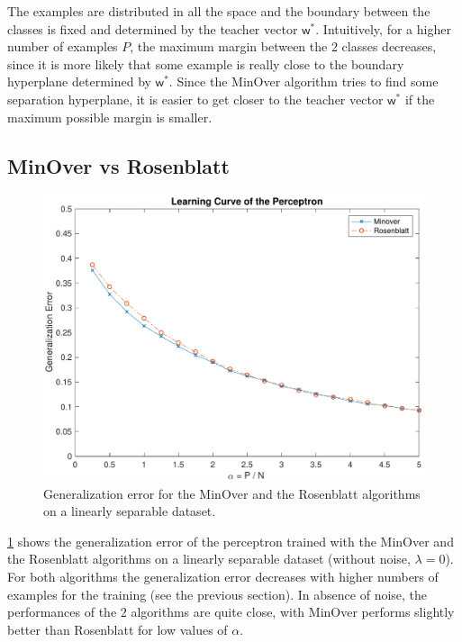 The examples are distributed in all the space and the boundary between the classes is fixed and determined by the teacher vector $\bm{\mathsf{w}}^{*}$.
Intuitively, for a higher number of examples $P$, the maximum margin between the $2$ classes decreases, since it is more likely that some example is really close to the boundary hyperplane determined by $\bm{\mathsf{w}}^{*}$.
Since the MinOver algorithm tries to find some separation hyperplane, it is easier to get closer to the teacher vector $\bm{\mathsf{w}}^{*}$ if the maximum possible margin is smaller.


\subsection{MinOver vs Rosenblatt}
\begin{figure}[t]
	\centering
	\includegraphics[width=\columnwidth]{figures/comparison}
    \caption{Generalization error for the MinOver and the Rosenblatt algorithms on a linearly separable dataset.}
	\label{fig:comparison}
\end{figure}

\cref{fig:comparison} shows the generalization error of the perceptron trained with the MinOver and the Rosenblatt algorithms on a linearly separable dataset (without noise, $\lambda = 0$).
For both algorithms the generalization error decreases with higher numbers of examples for the training (see the previous section).
In absence of noise, the performances of the $2$ algorithms are quite close, with MinOver performs slightly better than Rosenblatt for low values of $\alpha$.



